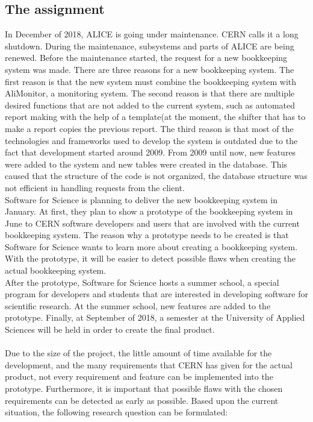 \documentclass[paper=a4, fontsize=11pt,twoside]{scrartcl}	%
\begin{document}
\subsection{The assignment}
In December of 2018, ALICE is going under maintenance. CERN calls it a long shutdown. During the maintenance, subsystems and parts of ALICE are being renewed. Before the maintenance started, the request for a new bookkeeping system was made. There are three reasons for a new bookkeeping system. The first reason is that the new system must combine the bookkeeping system with AliMonitor, a monitoring system. The second reason is that there are multiple desired functions that are not added to the current system, such as automated report making with the help of a template(at the moment, the shifter that has to make a report copies the previous report. The third reason is that most of the technologies and frameworks used to develop the system is outdated due to the fact that development started around 2009. From 2009 until now, new features were added to the system and new tables were created in the database. This caused that the structure of the code is not organized, the database structure was not efficient in handling requests from the client. \\
Software for Science is planning to deliver the new bookkeeping system in January. At first, they plan to show a prototype of the bookkeeping system in June to CERN software developers and users that are involved with the current bookkeeping system. The reason why a prototype needs to be created is that Software for Science wants to learn more about creating a bookkeeping system. With the prototype, it will be easier to detect possible flaws when creating the actual bookkeeping system. \\
After the prototype, Software for Science hosts a summer school, a special program for developers and students that are interested in developing software for scientific research. At the summer school, new features are added to the prototype. Finally, at September of 2018, a semester at the University of Applied Sciences will be held in order to create the final product. \\ \\ 
Due to the size of the project, the little amount of time available for the development, and the many requirements that CERN has given for the actual product, not every requirement and feature can be implemented into the prototype. Furthermore, it is important that possible flaws with the chosen requirements can be detected as early as possible. Based upon the current situation, the following research question can be formulated: \\ \\
\end{document}
